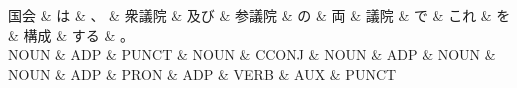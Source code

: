 \documentclass[tikz,border=5pt]{standalone}
\begin{document}
\normalsize
\begin{dependency}[edge unit distance=12.0pt]
    \begin{deptext}[column sep=1em]
        国会 \& は \& 、 \& 衆議院 \& 及び \& 参議院 \& の \& 両 \& 議院 \& で \& これ \& を \& 構成 \& する \& 。\\
        NOUN \& ADP \& PUNCT \& NOUN \& CCONJ \& NOUN \& ADP \& NOUN \& NOUN \& ADP \& PRON \& ADP \& VERB \& AUX \& PUNCT\\
    \end{deptext}
\end{dependency}
\end{document}
